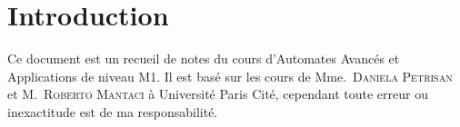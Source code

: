 \section{Introduction}

Ce document est un recueil de notes du cours d'Automates Avancés et Applications de niveau M1. Il est
basé sur les cours de Mme.~\textsc{Daniela Petrisan} et M.~\textsc{Roberto Mantaci} à Université Paris Cité, cependant toute
erreur ou inexactitude est de ma responsabilité. 


